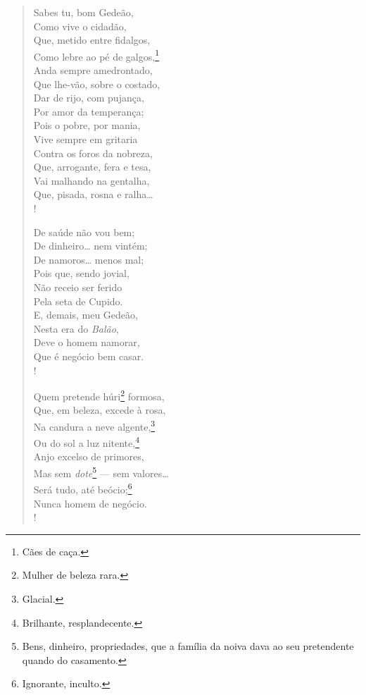 \begin{verse}
Sabes tu, bom Gedeão,\\
Como vive o cidadão,\\
Que, metido entre fidalgos,\\
Como lebre ao pé de galgos,\footnote{ Cães de caça.}\\
Anda sempre amedrontado,\\
Que lhe-vão, sobre o costado,\\
Dar de rijo, com pujança,\\
Por amor da temperança;\\
Pois o pobre, por mania,\\
Vive sempre em gritaria\\
Contra os foros da nobreza,\\
Que, arrogante, fera e tesa,\\
Vai malhando na gentalha,\\
Que, pisada, rosna e ralha\ldots{}\\!

De saúde não vou bem;\\
De dinheiro\ldots{} nem vintém;\\
De namoros\ldots{} menos mal;\\
Pois que, sendo jovial,\\
Não receio ser ferido\\
Pela seta de Cupido.\\
E, demais, meu Gedeão,\\
Nesta era do \emph{Balão},\\
Deve o homem namorar,\\
Que é negócio bem casar.\\!

Quem pretende húri\footnote{ Mulher de beleza rara.} formosa,\\
Que, em beleza, excede à rosa,\\
Na candura a neve algente,\footnote{ Glacial.}\\
Ou do sol a luz nitente,\footnote{ Brilhante, resplandecente.}\\
Anjo excelso de primores,\\
Mas sem \emph{dote}\footnote{ Bens, dinheiro, propriedades, que a
          família da noiva dava ao seu pretendente quando do casamento.}
--- sem valores\ldots{}\\
Será tudo, até beócio;\footnote{ Ignorante, inculto.}\\
Nunca homem de negócio.\\!


\end{verse}
